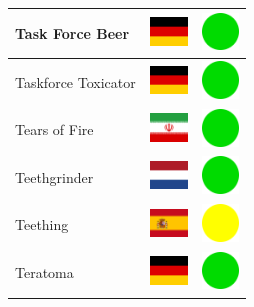 \documentclass[12pt, a4paper, twoside]{report}
\begin{document}
\begin{center}
\begin{longtable}{|p{5cm}|p{2cm}|p{2cm}|}
 Task Force Beer                                            & \includegraphics[width=1cm]{../img/flags/de} &   \includegraphics[width=1cm]{../likes/y} \\ \hline
 Taskforce Toxicator                                        & \includegraphics[width=1cm]{../img/flags/de} &   \includegraphics[width=1cm]{../likes/y} \\ \hline
 Tears of Fire                                              & \includegraphics[width=1cm]{../img/flags/ir} &   \includegraphics[width=1cm]{../likes/y} \\ \hline
 Teethgrinder                                               & \includegraphics[width=1cm]{../img/flags/nl} &   \includegraphics[width=1cm]{../likes/y} \\ \hline
 Teething                                                   & \includegraphics[width=1cm]{../img/flags/es} &   \includegraphics[width=1cm]{../likes/m} \\ \hline
 Teratoma                                                   & \includegraphics[width=1cm]{../img/flags/de} &   \includegraphics[width=1cm]{../likes/y} \\ \hline

\end{longtable}
\end{center}
\end{document}
